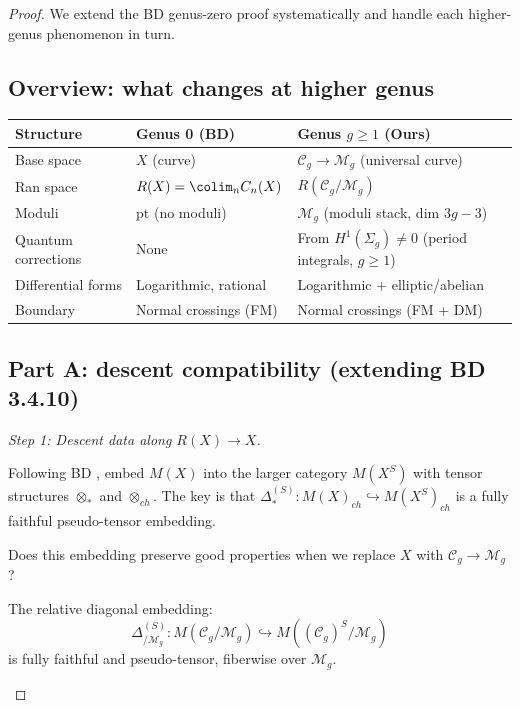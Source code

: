 \begin{proof}

We extend the BD genus-zero proof systematically and handle each higher-genus phenomenon in turn.

\subsection*{Overview: what changes at higher genus}

\begin{center}
\begin{tabular}{|l|p{5cm}|p{5cm}|}
\hline
\textbf{Structure} & \textbf{Genus 0 (BD)} & \textbf{Genus $g \geq 1$ (Ours)} \\
\hline
Base space & $X$ (curve) & $\mathcal{C}_g \to \mathcal{M}_g$ (universal curve) \\
\hline
Ran space & $R(X) = \colim_n C_n(X)$ & $R(\mathcal{C}_g/\mathcal{M}_g)$ \\
\hline
Moduli & $\text{pt}$ (no moduli) & $\mathcal{M}_g$ (moduli stack, dim $3g-3$) \\
\hline
Quantum corrections & None & From $H^1(\Sigma_g) \neq 0$ (period integrals, $g \geq 1$) \\
\hline
Differential forms & Logarithmic, rational & Logarithmic + elliptic/abelian \\
\hline
Boundary & Normal crossings (FM) & Normal crossings (FM + DM) \\
\hline
\end{tabular}
\end{center}

\subsection*{Part A: descent compatibility (extending BD 3.4.10)}

\emph{Step 1: Descent data along $R(X) \to X$.}

Following BD \cite[§3.4.10-3.4.11]{BD04}, embed $M(X)$ into the larger category 
$M(X^S)$ with tensor structures $\otimes_*$ and $\otimes_{ch}$. The key is that 
$\Delta^{(S)}_*: M(X)_{ch} \hookrightarrow M(X^S)_{ch}$ is a fully faithful 
pseudo-tensor embedding.

Does this embedding preserve good properties when we replace $X$ with $\mathcal{C}_g \to \mathcal{M}_g$?

\begin{lemma}\label{lem:relative-diagonal}
The relative diagonal embedding:
\[\Delta^{(S)}_{/\mathcal{M}_g}: M(\mathcal{C}_g/\mathcal{M}_g) \hookrightarrow M((\mathcal{C}_g)^S/\mathcal{M}_g)\]
is fully faithful and pseudo-tensor, fiberwise over $\mathcal{M}_g$.
\end{lemma}


\end{proof}
